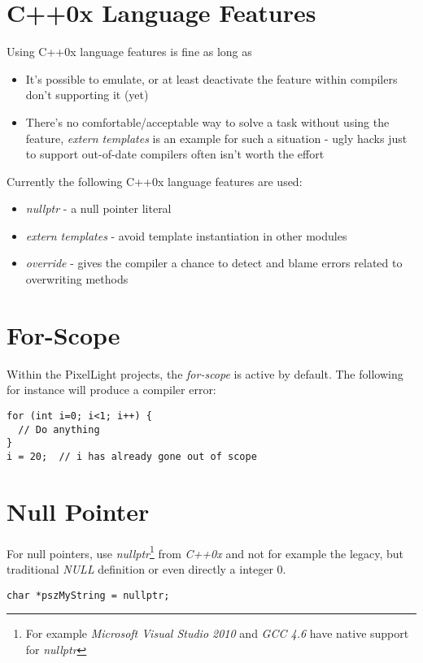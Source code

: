 \section{C++0x Language Features}
Using C++0x language features is fine as long as
\begin{itemize}
\item{It's possible to emulate, or at least deactivate the feature within compilers don't supporting it (yet)}
\item{There's no comfortable/acceptable way to solve a task without using the feature, \emph{extern templates} is an example for such a situation - ugly hacks just to support out-of-date compilers often isn't worth the effort}
\end{itemize}
\textsl{}
Currently the following C++0x language features are used:
\begin{itemize}
\item{\emph{nullptr} - a null pointer literal}
\item{\emph{extern templates} - avoid template instantiation in other modules}
\item{\emph{override} - gives the compiler a chance to detect and blame errors related to overwriting methods}
\end{itemize}





\section{For-Scope}
Within the PixelLight projects, the \emph{for-scope} is active by default. The following for instance will produce a compiler error:
\begin{lstlisting}[caption=for-scope]
for (int i=0; i<1; i++) {
  // Do anything
}
i = 20;  // i has already gone out of scope
\end{lstlisting}




\section{Null Pointer}
For null pointers, use \emph{nullptr}\footnote{For example \emph{Microsoft Visual Studio 2010} and \emph{GCC 4.6} have native support for \emph{nullptr}} from \emph{C++0x} and not for example the legacy, but traditional \emph{NULL} definition or even directly a integer $0$.

\begin{lstlisting}[caption=Null pointer]
char *pszMyString = nullptr;
\end{lstlisting}




